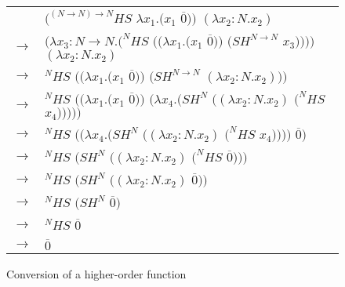 \begin{figure}[tb]
\centering
\begin{tabular}{ll}
\vspace{5pt}

& $(^{(N\rightarrow N)\rightarrow N}HS$ $\lambda x_{1}.(x_{1}$ $\overline{0}))$ $(\lambda x_{2}:N.x_{2})$ \\

\vspace{5pt}

$\rightarrow$ & $(\lambda x_{3}:N\rightarrow N.(^{N}HS$ $((\lambda x_{1}.(x_{1}$ $\overline{0}))$ $(SH^{N\rightarrow N}$ $x_{3}))))$ $(\lambda x_{2}:N.x_{2})$ \\

\vspace{5pt}

$\rightarrow$ & ${^{N}H}S$ $((\lambda x_{1}.(x_{1}$ $\overline{0}))$ $(SH^{N\rightarrow N}$ $(\lambda x_{2}:N.x_{2})))$ \\

\vspace{5pt}

$\rightarrow$ & ${^{N}H}S$ $((\lambda x_{1}.(x_{1}$ $\overline{0}))$ $(\lambda x_{4}.(SH^{N}$ $((\lambda x_{2}:N.x_{2})$ $(^{N}HS$ $x_{4})))))$ \\

\vspace{5pt}

$\rightarrow$ & ${^{N}H}S$ $((\lambda x_{4}.(SH^{N}$ $((\lambda x_{2}:N.x_{2})$ $(^{N}HS$ $x_{4}))))$ $\overline{0})$ \\

\vspace{5pt}

$\rightarrow$ & ${^{N}H}S$ $(SH^{N}$ $((\lambda x_{2}:N.x_{2})$ $(^{N}HS$ $\overline{0})))$ \\

\vspace{5pt}

$\rightarrow$ & ${^{N}H}S$ $(SH^{N}$ $((\lambda x_{2}:N.x_{2})$ $\overline{0}))$ \\

\vspace{5pt}

$\rightarrow$ & ${^{N}H}S$ $(SH^{N}$ $\overline{0})$ \\

\vspace{5pt}

$\rightarrow$ & ${^{N}H}S$ $\overline{0}$ \\

\vspace{5pt}

$\rightarrow$ & $\overline{0}$
\end{tabular}
\caption{Conversion of a higher-order function}
\label{function-2}
\end{figure}